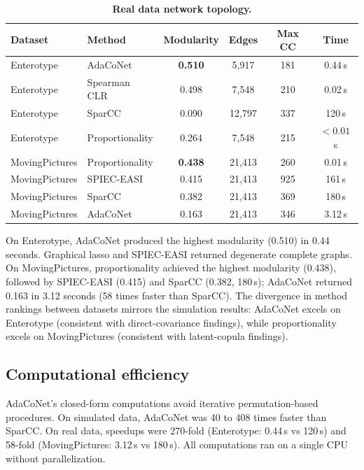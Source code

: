 \documentclass[fleqn]{nature}
\begin{document}
\begin{table}[htbp]
\caption{\textbf{Real data network topology.}}
\label{tab:real}
\centering
\begin{tabular}{llcccc}
\toprule
Dataset & Method & Modularity & Edges & Max CC & Time \\
\midrule
Enterotype & AdaCoNet         & \textbf{0.510} & 5,917   & 181 & 0.44\,s \\
Enterotype & Spearman CLR      & 0.498          & 7,548   & 210 & 0.02\,s \\
Enterotype & SparCC            & 0.090          & 12,797  & 337 & 120\,s  \\
Enterotype & Proportionality   & 0.264          & 7,548   & 215 & $<0.01$\,s \\
\midrule
MovingPictures & Proportionality & \textbf{0.438} & 21,413 & 260 & 0.01\,s \\
MovingPictures & SPIEC-EASI      & 0.415          & 21,413 & 925 & 161\,s  \\
MovingPictures & SparCC          & 0.382          & 21,413 & 369 & 180\,s  \\
MovingPictures & AdaCoNet        & 0.163          & 21,413 & 346 & 3.12\,s \\
\bottomrule
\end{tabular}
\end{table}

On Enterotype, AdaCoNet produced the highest modularity (0.510) in 0.44 seconds.
Graphical lasso and SPIEC-EASI returned degenerate complete graphs.
On MovingPictures, proportionality achieved the highest modularity (0.438), followed by SPIEC-EASI (0.415) and SparCC (0.382, 180\,s); AdaCoNet returned 0.163 in 3.12 seconds (58 times faster than SparCC).
The divergence in method rankings between datasets mirrors the simulation results: AdaCoNet excels on Enterotype (consistent with direct-covariance findings), while proportionality excels on MovingPictures (consistent with latent-copula findings).


\subsection*{Computational efficiency}

AdaCoNet's closed-form computations avoid iterative permutation-based procedures.
On simulated data, AdaCoNet was 40 to 408 times faster than SparCC.
On real data, speedups were 270-fold (Enterotype: 0.44\,s vs 120\,s) and 58-fold (MovingPictures: 3.12\,s vs 180\,s).
All computations ran on a single CPU without parallelization.
\end{document}
